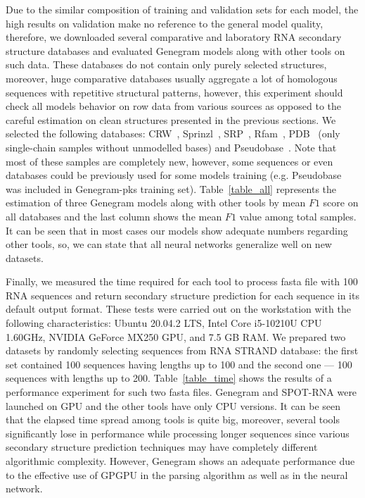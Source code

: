 Due to the similar composition of training and validation sets for each model, the high results on validation make no reference to the general model quality, therefore, we downloaded several comparative and laboratory RNA secondary structure databases and evaluated Genegram models along with other tools on such data. These databases do not contain only purely selected structures, moreover, huge comparative databases usually aggregate a lot of homologous sequences with repetitive structural patterns, however, this experiment should check all models behavior on row data from various sources as opposed to the careful estimation on clean structures presented in the previous sections. We selected the following databases: CRW~\cite{cannone2002comparative}, Sprinzl~\cite{sprinzl1998compilation}, SRP~\cite{zwieb1992signal}, Rfam~\cite{griffiths2003rfam}, PDB~\cite{berman2000protein} (only single-chain samples without unmodelled bases) and Pseudobase~\cite{van2000pseudobase}. Note that most of these samples are completely new, however, some sequences or even databases could be previously used for some models training (e.g. Pseudobase was included in Genegram-pks training set). Table~\ref{table_all} represents the estimation of three Genegram models along with other tools by mean $F1$ score on all databases and the last column shows the mean $F1$ value among total samples. It can be seen that in most cases our models show adequate numbers regarding other tools, so, we can state that all neural networks generalize well on new datasets.



Finally, we measured the time required for each tool to process fasta file with 100 RNA sequences and return secondary structure prediction for each sequence in its default output format. These tests were carried out on the workstation with the following characteristics: Ubuntu 20.04.2 LTS, Intel Core i5-10210U CPU 1.60GHz, NVIDIA GeForce MX250 GPU, and 7.5 GB RAM. We prepared two datasets by randomly selecting sequences from RNA STRAND database: the first set contained 100 sequences having lengths up to 100 and the second one --- 100 sequences with lengths up to 200. Table~\ref{table_time} shows the results of a performance experiment for such two fasta files. Genegram and SPOT-RNA were launched on GPU and the other tools have only CPU versions. It can be seen that the elapsed time spread among tools is quite big, moreover, several tools significantly lose in performance while processing longer sequences since various secondary structure prediction techniques may have completely different algorithmic complexity. However, Genegram shows an adequate performance due to the effective use of GPGPU in the parsing algorithm as well as in the neural network.

